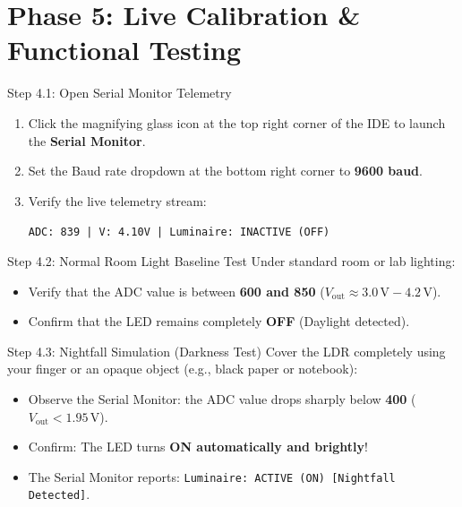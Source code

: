 \documentclass[12pt,a4paper]{article}
\begin{document}
\vspace{0.2cm}

\section*{Phase 5: Live Calibration \& Functional Testing}

\begin{stepbox}{Step 4.1: Open Serial Monitor Telemetry}
\begin{enumerate}
    \item Click the magnifying glass icon at the top right corner of the IDE to launch the \textbf{Serial Monitor}.
    \item Set the Baud rate dropdown at the bottom right corner to \textbf{9600 baud}.
    \item Verify the live telemetry stream:
    \begin{center}
    \texttt{ADC: 839 | V: 4.10V | Luminaire: INACTIVE (OFF)}
    \end{center}
\end{enumerate}
\end{stepbox}

\begin{stepbox}{Step 4.2: Normal Room Light Baseline Test}
Under standard room or lab lighting:
\begin{itemize}
    \item Verify that the ADC value is between \textbf{600 and 850} ($V_{\text{out}} \approx 3.0\,\text{V} - 4.2\,\text{V}$).
    \item Confirm that the LED remains completely \textbf{OFF} (Daylight detected).
\end{itemize}
\end{stepbox}

\begin{stepbox}{Step 4.3: Nightfall Simulation (Darkness Test)}
Cover the LDR completely using your finger or an opaque object (e.g., black paper or notebook):
\begin{itemize}
    \item Observe the Serial Monitor: the ADC value drops sharply below \textbf{400} ($V_{\text{out}} < 1.95\,\text{V}$).
    \item Confirm: The LED turns \textbf{ON automatically and brightly}!
    \item The Serial Monitor reports: \texttt{Luminaire: ACTIVE (ON) [Nightfall Detected]}.
\end{itemize}
\end{stepbox}
\end{document}

